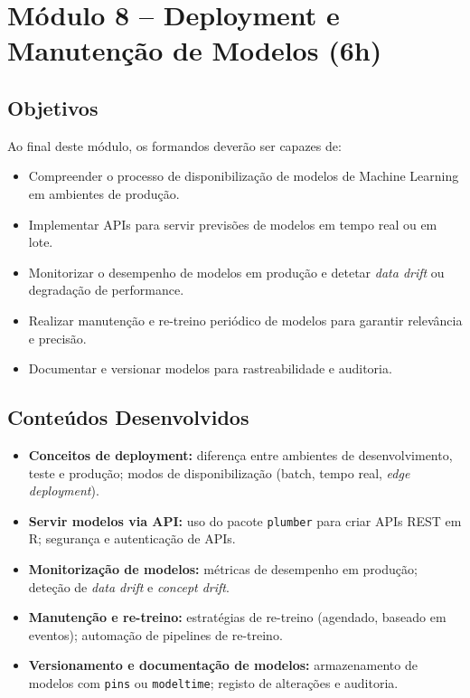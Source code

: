 \section{\textcolor{sectionred}{Módulo 8 – Deployment e Manutenção de Modelos (6h)}}

\subsection{\textcolor{subsectionblue}{Objetivos}}
Ao final deste módulo, os formandos deverão ser capazes de:
\begin{itemize}
  \item Compreender o processo de disponibilização de modelos de Machine Learning em ambientes de produção.  
  \item Implementar APIs para servir previsões de modelos em tempo real ou em lote.  
  \item Monitorizar o desempenho de modelos em produção e detetar \textit{data drift} ou degradação de performance.  
  \item Realizar manutenção e re-treino periódico de modelos para garantir relevância e precisão.  
  \item Documentar e versionar modelos para rastreabilidade e auditoria.
\end{itemize}

\subsection{\textcolor{subsectionblue}{Conteúdos Desenvolvidos}}
\begin{itemize}
  \item \textbf{Conceitos de deployment:} diferença entre ambientes de desenvolvimento, teste e produção; modos de disponibilização (batch, tempo real, \textit{edge deployment}).
  \item \textbf{Servir modelos via API:} uso do pacote \texttt{plumber} para criar APIs REST em R; segurança e autenticação de APIs.
  \item \textbf{Monitorização de modelos:} métricas de desempenho em produção; deteção de \textit{data drift} e \textit{concept drift}.
  \item \textbf{Manutenção e re-treino:} estratégias de re-treino (agendado, baseado em eventos); automação de pipelines de re-treino.
  \item \textbf{Versionamento e documentação de modelos:} armazenamento de modelos com \texttt{pins} ou \texttt{modeltime}; registo de alterações e auditoria.
\end{itemize}

